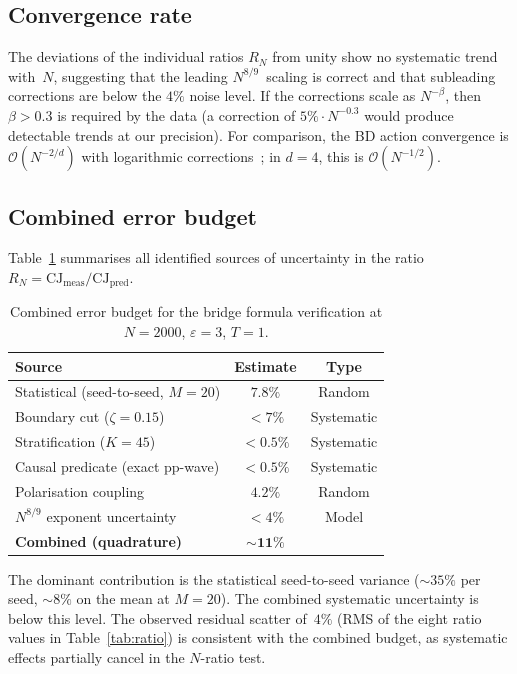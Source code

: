 \documentclass[12pt,a4paper]{article}
\theoremstyle{plain}
\theoremstyle{definition}
\theoremstyle{remark}
\newcommand{\order}{\mathcal{O}}
\newcommand{\CJ}{\mathrm{CJ}}
\begin{document}
\subsection{Convergence rate}
\label{sec:convergence}

The deviations of the individual ratios $R_N$ from unity show no
systematic trend with~$N$, suggesting that the leading
$N^{8/9}$~scaling is correct and that subleading corrections are
below the $4\%$ noise level.  If the corrections scale as
$N^{-\beta}$, then $\beta > 0.3$ is required by the data
(a correction of $5\% \cdot N^{-0.3}$ would produce detectable
trends at our precision).  For comparison, the BD action
convergence is $\order(N^{-2/d})$ with logarithmic
corrections~\cite{Belenchia:2015}; in $d = 4$, this is
$\order(N^{-1/2})$.

\subsection{Combined error budget}
\label{sec:errorbudget}

Table~\ref{tab:errorbudget} summarises all identified sources of
uncertainty in the ratio $R_N = \CJ_{\mathrm{meas}}/\CJ_{\mathrm{pred}}$.

\begin{table}[ht]
\centering
\caption{Combined error budget for the bridge formula verification
at $N = 2000$, $\varepsilon = 3$, $T = 1$.}
\label{tab:errorbudget}
\begin{tabular}{lcc}
\toprule
Source & Estimate & Type \\
\midrule
Statistical (seed-to-seed, $M = 20$) & $7.8\%$ & Random \\
Boundary cut ($\zeta = 0.15$) & $< 7\%$ & Systematic \\
Stratification ($K = 45$) & $< 0.5\%$ & Systematic \\
Causal predicate (exact pp-wave) & $< 0.5\%$ & Systematic \\
Polarisation coupling & $4.2\%$ & Random \\
$N^{8/9}$ exponent uncertainty & $< 4\%$ & Model \\
\midrule
\textbf{Combined (quadrature)} & $\mathbf{\sim 11\%}$ & \\
\bottomrule
\end{tabular}
\end{table}

The dominant contribution is the statistical seed-to-seed variance
($\sim 35\%$ per seed, $\sim 8\%$ on the mean at $M = 20$).  The
combined systematic uncertainty is below this level.  The observed
residual scatter of~$4\%$ (RMS of the eight ratio values in
Table~\ref{tab:ratio}) is consistent with the combined budget, as
systematic effects partially cancel in the $N$-ratio test.
\end{document}
